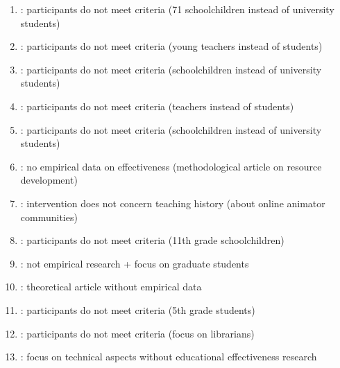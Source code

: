 \documentclass[
hf,
]{ceurart}
\begin{document}
\begin{enumerate}
    \item \citet{Shawalludin2024119}: participants do not meet criteria (71 schoolchildren instead of university students)
    
    \item \citet{Graham200810}: participants do not meet criteria (young teachers instead of students)
    
    \item \citet{Muenster20231105}: participants do not meet criteria (schoolchildren instead of university students)
    
    \item \citet{Manfra2008223}: participants do not meet criteria (teachers instead of students)
    
    \item \citet{Pescador20192}: participants do not meet criteria (schoolchildren instead of university students)
    
    \item \citet{Calandra2005323}: no empirical data on effectiveness (methodological article on resource development)
    
    \item \citet{Luther20106571}: intervention does not concern teaching history (about online animator communities)
    
    
    \item \citet{Matitaputty2024430}: participants do not meet criteria (11th grade schoolchildren)
    
    \item \citet{Burman2018297}: not empirical research + focus on graduate students
    
    \item \citet{Wang2020283}: theoretical article without empirical data
    
    \item \citet{Shiue2017460}: participants do not meet criteria (5th grade students)
    
    \item \citet{Corlett-Rivera2017}: participants do not meet criteria (focus on librarians)
    
    \item \citet{Baeva2018782}: focus on technical aspects without educational effectiveness research
    

\end{enumerate}
\end{document}
